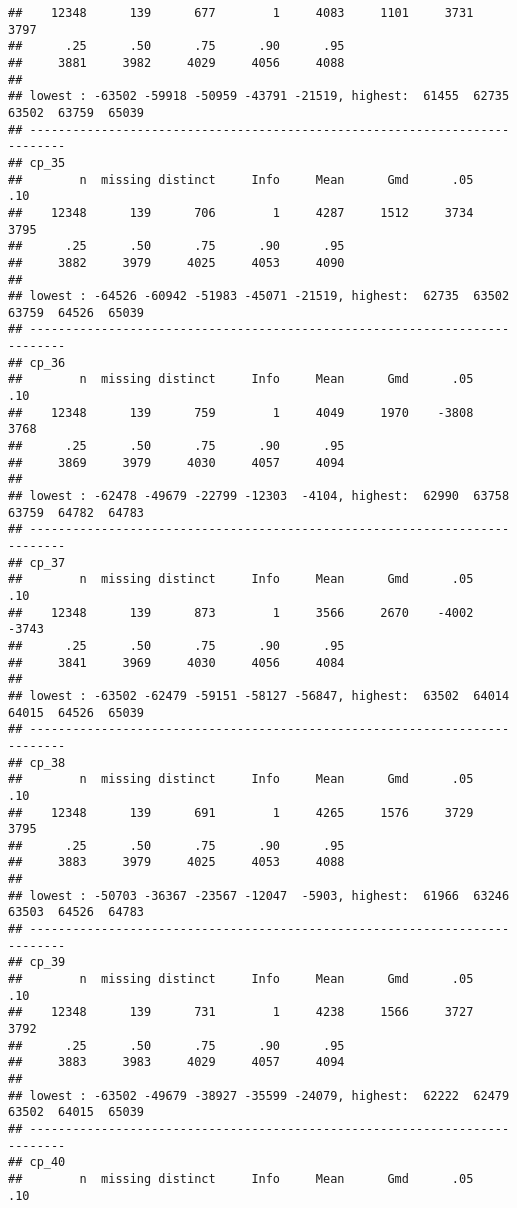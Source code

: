 \documentclass[]{article}
\begin{document}
\begin{verbatim}
##    12348      139      677        1     4083     1101     3731     3797 
##      .25      .50      .75      .90      .95 
##     3881     3982     4029     4056     4088 
## 
## lowest : -63502 -59918 -50959 -43791 -21519, highest:  61455  62735  63502  63759  65039
## ---------------------------------------------------------------------------
## cp_35 
##        n  missing distinct     Info     Mean      Gmd      .05      .10 
##    12348      139      706        1     4287     1512     3734     3795 
##      .25      .50      .75      .90      .95 
##     3882     3979     4025     4053     4090 
## 
## lowest : -64526 -60942 -51983 -45071 -21519, highest:  62735  63502  63759  64526  65039
## ---------------------------------------------------------------------------
## cp_36 
##        n  missing distinct     Info     Mean      Gmd      .05      .10 
##    12348      139      759        1     4049     1970    -3808     3768 
##      .25      .50      .75      .90      .95 
##     3869     3979     4030     4057     4094 
## 
## lowest : -62478 -49679 -22799 -12303  -4104, highest:  62990  63758  63759  64782  64783
## ---------------------------------------------------------------------------
## cp_37 
##        n  missing distinct     Info     Mean      Gmd      .05      .10 
##    12348      139      873        1     3566     2670    -4002    -3743 
##      .25      .50      .75      .90      .95 
##     3841     3969     4030     4056     4084 
## 
## lowest : -63502 -62479 -59151 -58127 -56847, highest:  63502  64014  64015  64526  65039
## ---------------------------------------------------------------------------
## cp_38 
##        n  missing distinct     Info     Mean      Gmd      .05      .10 
##    12348      139      691        1     4265     1576     3729     3795 
##      .25      .50      .75      .90      .95 
##     3883     3979     4025     4053     4088 
## 
## lowest : -50703 -36367 -23567 -12047  -5903, highest:  61966  63246  63503  64526  64783
## ---------------------------------------------------------------------------
## cp_39 
##        n  missing distinct     Info     Mean      Gmd      .05      .10 
##    12348      139      731        1     4238     1566     3727     3792 
##      .25      .50      .75      .90      .95 
##     3883     3983     4029     4057     4094 
## 
## lowest : -63502 -49679 -38927 -35599 -24079, highest:  62222  62479  63502  64015  65039
## ---------------------------------------------------------------------------
## cp_40 
##        n  missing distinct     Info     Mean      Gmd      .05      .10 

\end{verbatim}
\end{document}
